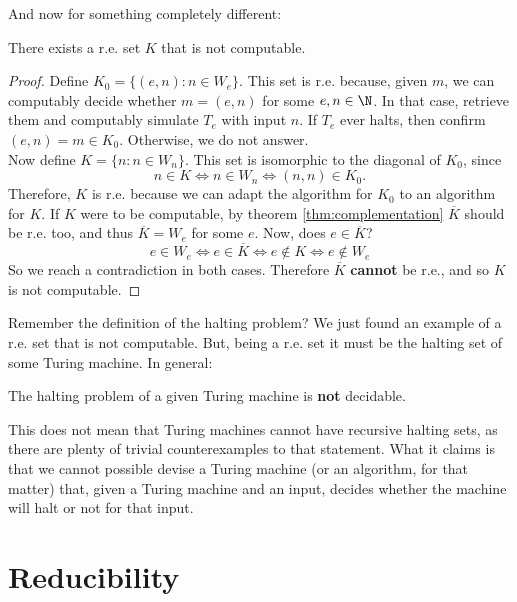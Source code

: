 \documentclass[../main.tex]{memoir}
\begin{document}
And now for something completely different:

\begin{theorem}
  \label{thm:re-not-r-set}
  There exists a r.e. set $K$ that is not computable.
\end{theorem}
\begin{proof}
  Define $K_0 = \{(e, n): n \in W_e \}$. This set is r.e. because, given $m$, we can computably decide whether $m = (e, n)$ for some $e, n \in \N$. In that case, retrieve them and computably simulate $T_e$ with input $n$. If $T_e$ ever halts, then confirm $(e, n) = m \in K_0$. Otherwise, we do not answer. \\
  Now define $K = \{n: n \in W_n\}$. This set is isomorphic to the diagonal of $K_0$, since
  \[ n \in K \iff n \in W_n \iff (n, n) \in K_0. \]
  Therefore, $K$ is r.e. because we can adapt the algorithm for $K_0$ to an algorithm for $K$.
  If $K$ were to be computable, by theorem \ref{thm:complementation} $\overline{K}$ should be r.e. too, and thus $\overline{K} = W_e$ for some $e$. Now, does $e \in \overline{K}$?
  \[ e \in W_e \iff e \in \overline{K} \iff e \not\in K \iff e \not\in W_e \]
  So we reach a contradiction in both cases. Therefore $\overline{K}$ \textbf{cannot} be r.e., and so $K$ is not computable.
\end{proof}

Remember the definition of the halting problem? We just found an example of a r.e. set that is not computable. But, being a r.e. set it must be the halting set of some Turing machine. In general:

\begin{corollary}
  The halting problem of a given Turing machine is \textbf{not} decidable.
\end{corollary}

This does not mean that Turing machines cannot have recursive halting sets, as there are plenty of trivial counterexamples to that statement. What it claims is that we cannot possible devise a Turing machine (or an algorithm, for that matter) that, given a Turing machine and an input, decides whether the machine will halt or not for that input. \\


\section{Reducibility}
\end{document}
